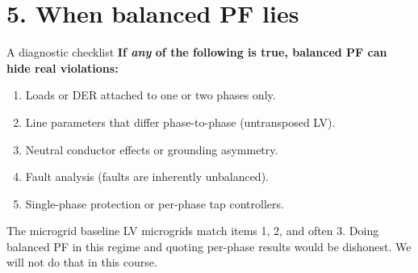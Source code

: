 \documentclass[aspectratio=169,10pt]{beamer}
\begin{document}
\section*{5. When balanced PF lies}

\begin{frame}{A diagnostic checklist}
\textbf{If \emph{any} of the following is true, balanced PF can hide real violations:}
\begin{enumerate}
  \item Loads or DER attached to one or two phases only.
  \item Line parameters that differ phase-to-phase (untransposed LV).
  \item Neutral conductor effects or grounding asymmetry.
  \item Fault analysis (faults are inherently unbalanced).
  \item Single-phase protection or per-phase tap controllers.
\end{enumerate}
\vspace{0.4em}
\begin{alertblock}{The microgrid baseline}
LV microgrids match items 1, 2, and often 3. Doing balanced PF in this regime and quoting per-phase results would be dishonest. We will not do that in this course.
\end{alertblock}
\end{frame}
\end{document}
